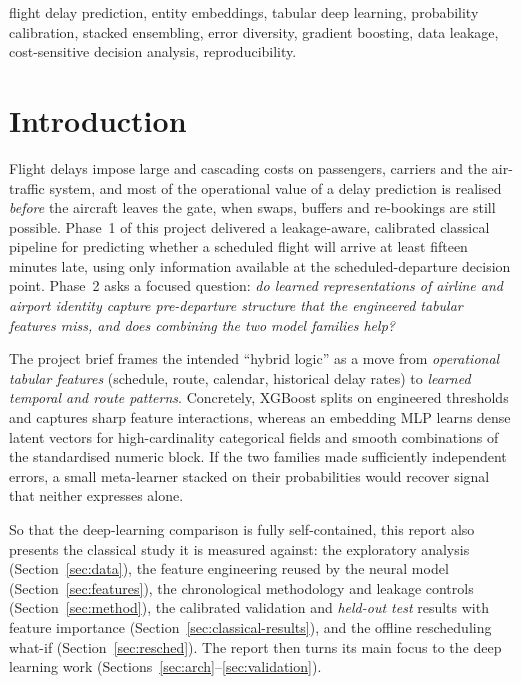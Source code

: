 \documentclass[conference]{IEEEtran}
\begin{document}
\begin{IEEEkeywords}
flight delay prediction, entity embeddings, tabular deep learning, probability
calibration, stacked ensembling, error diversity, gradient boosting, data
leakage, cost-sensitive decision analysis, reproducibility.
\end{IEEEkeywords}

\section{Introduction}
\label{sec:intro}
Flight delays impose large and cascading costs on passengers, carriers and the
air-traffic system, and most of the operational value of a delay prediction is
realised \emph{before} the aircraft leaves the gate, when swaps, buffers and
re-bookings are still possible. Phase~1 of this project delivered a
leakage-aware, calibrated classical pipeline for predicting whether a scheduled
flight will arrive at least fifteen minutes late, using only information
available at the scheduled-departure decision point. Phase~2 asks a focused
question: \emph{do learned representations of airline and airport identity
capture pre-departure structure that the engineered tabular features miss, and
does combining the two model families help?}

The project brief frames the intended ``hybrid logic'' as a move from
\emph{operational tabular features} (schedule, route, calendar, historical delay
rates) to \emph{learned temporal and route patterns}. Concretely, XGBoost splits
on engineered thresholds and captures sharp feature interactions, whereas an
embedding MLP learns dense latent vectors for high-cardinality categorical
fields and smooth combinations of the standardised numeric block. If the two
families made sufficiently independent errors, a small meta-learner stacked on
their probabilities would recover signal that neither expresses alone.

So that the deep-learning comparison is fully self-contained, this report also
presents the classical study it is measured against: the exploratory analysis
(Section~\ref{sec:data}), the feature engineering reused by the neural model
(Section~\ref{sec:features}), the chronological methodology and leakage controls
(Section~\ref{sec:method}), the calibrated validation and \emph{held-out test}
results with feature importance (Section~\ref{sec:classical-results}), and the
offline rescheduling what-if (Section~\ref{sec:resched}). The report then turns
its main focus to the deep learning work
(Sections~\ref{sec:arch}--\ref{sec:validation}).
\end{document}
